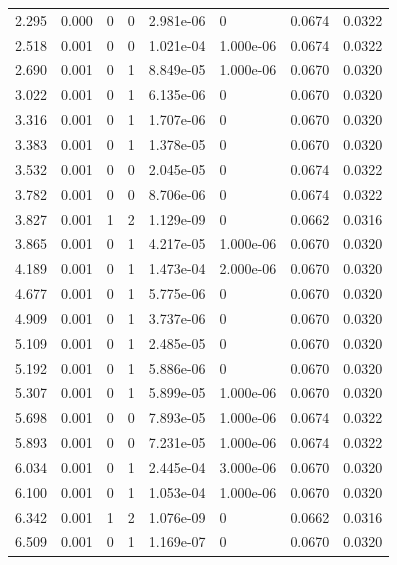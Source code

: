 \documentclass[preview]{standalone}
\begin{document}
{{\begin{tabular}{L{1.2cm}C{1.2cm} C{0.3cm}C{0.5cm} C{1.4cm}C{1.4cm} C{1.4cm}C{1.4cm}}
  2.295  &  0.000  & 0     &  0 &  2.981e-06  & 0  & 0.0674 &  0.0322   \\ 
  2.518  &  0.001  & 0     &  0 &  1.021e-04  & 1.000e-06  & 0.0674 &  0.0322   \\ 
  2.690  &  0.001  & 0     &  1 &  8.849e-05  & 1.000e-06  & 0.0670 &  0.0320   \\ 
  3.022  &  0.001  & 0     &  1 &  6.135e-06  & 0  & 0.0670 &  0.0320   \\ 
  3.316  &  0.001  & 0     &  1 &  1.707e-06  & 0  & 0.0670 &  0.0320   \\ 
  3.383  &  0.001  & 0     &  1 &  1.378e-05  & 0  & 0.0670 &  0.0320   \\ 
  3.532  &  0.001  & 0     &  0 &  2.045e-05  & 0  & 0.0674 &  0.0322   \\ 
  3.782  &  0.001  & 0     &  0 &  8.706e-06  & 0  & 0.0674 &  0.0322   \\ 
  3.827  &  0.001  & 1     &  2 &  1.129e-09  & 0  & 0.0662 &  0.0316   \\ 
  3.865  &  0.001  & 0     &  1 &  4.217e-05  & 1.000e-06  & 0.0670 &  0.0320   \\ 
  4.189  &  0.001  & 0     &  1 &  1.473e-04  & 2.000e-06  & 0.0670 &  0.0320   \\ 
  4.677  &  0.001  & 0     &  1 &  5.775e-06  & 0  & 0.0670 &  0.0320   \\ 
  4.909  &  0.001  & 0     &  1 &  3.737e-06  & 0  & 0.0670 &  0.0320   \\ 
  5.109  &  0.001  & 0     &  1 &  2.485e-05  & 0  & 0.0670 &  0.0320   \\ 
  5.192  &  0.001  & 0     &  1 &  5.886e-06  & 0  & 0.0670 &  0.0320   \\ 
  5.307  &  0.001  & 0     &  1 &  5.899e-05  & 1.000e-06  & 0.0670 &  0.0320   \\ 
  5.698  &  0.001  & 0     &  0 &  7.893e-05  & 1.000e-06  & 0.0674 &  0.0322   \\ 
  5.893  &  0.001  & 0     &  0 &  7.231e-05  & 1.000e-06  & 0.0674 &  0.0322   \\ 
  6.034  &  0.001  & 0     &  1 &  2.445e-04  & 3.000e-06  & 0.0670 &  0.0320   \\ 
  6.100  &  0.001  & 0     &  1 &  1.053e-04  & 1.000e-06  & 0.0670 &  0.0320   \\ 
  6.342  &  0.001  & 1     &  2 &  1.076e-09  & 0  & 0.0662 &  0.0316   \\ 
  6.509  &  0.001  & 0     &  1 &  1.169e-07  & 0  & 0.0670 &  0.0320   \\ 

\end{tabular}}}
\end{document}
